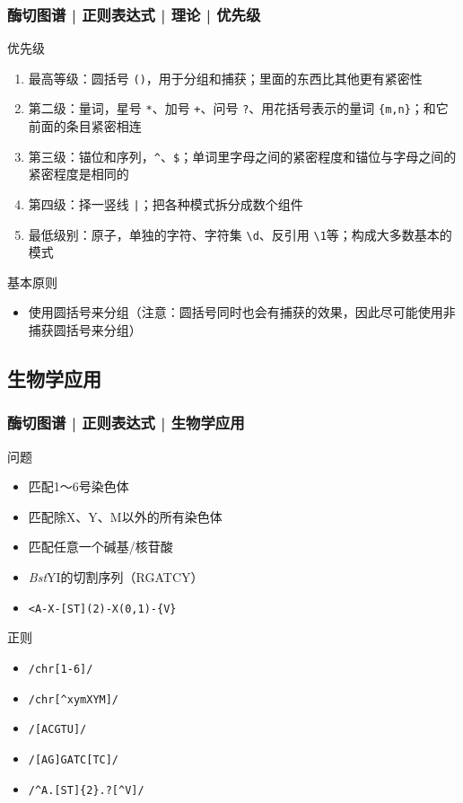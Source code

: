 \begin{frame}[fragile]
  \frametitle{酶切图谱 | 正则表达式 | 理论 | \alert{优先级}}
  \begin{block}{优先级}
  \begin{enumerate}
    \item 最高等级：圆括号 \verb|()|，用于分组和捕获；里面的东西比其他更有紧密性
    \item 第二级：量词，星号 \verb|*|、加号 \verb|+|、问号 \verb|?|、用花括号表示的量词 \verb|{m,n}|；和它前面的条目紧密相连
    \item 第三级：锚位和序列，\verb|^|、\verb|$|；单词里字母之间的紧密程度和锚位与字母之间的紧密程度是相同的
    \item 第四级：择一竖线 \verb=|=；把各种模式拆分成数个组件
    \item 最低级别：原子，单独的字符、字符集 \verb|\d|、反引用 \verb|\1|等；构成大多数基本的模式
  \end{enumerate}
  \end{block}
  \pause
  \begin{block}{基本原则}
    \begin{itemize}
      \item \alert{使用圆括号来分组}（注意：圆括号同时也会有捕获的效果，因此尽可能使用非捕获圆括号来分组）
    \end{itemize}
  \end{block}
\end{frame}

\subsection{生物学应用}
\begin{frame}[fragile]
  \frametitle{酶切图谱 | 正则表达式 | \alert{生物学应用}}
  \begin{block}{问题}
    \begin{itemize}
      \item<1-> 匹配1～6号染色体
      \item<3-> 匹配除X、Y、M以外的所有染色体
      \item<5-> 匹配任意一个碱基/核苷酸
      \item<7-> \textit{Bst}YI的切割序列（RGATCY）
      \item<9-> \verb|<A-X-[ST](2)-X(0,1)-{V}|
    \end{itemize}
  \end{block}
  \begin{block}{正则}
    \begin{itemize}
      \item<2-> \verb|/chr[1-6]/|
      \item<4-> \verb|/chr[^xymXYM]/|
      \item<6-> \verb|/[ACGTU]/|
      \item<8-> \verb|/[AG]GATC[TC]/|
      \item<10-> \verb|/^A.[ST]{2}.?[^V]/|
    \end{itemize}
  \end{block}
\end{frame}


